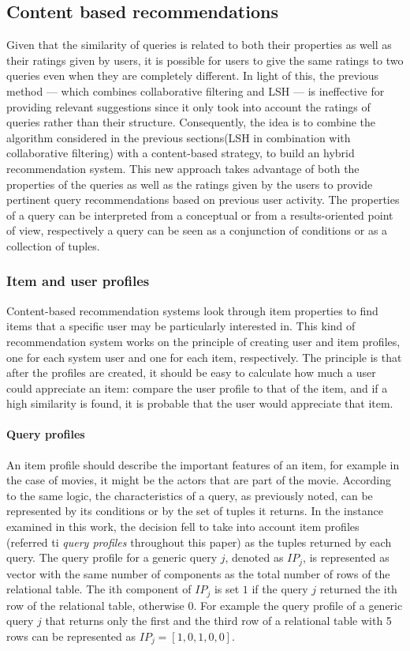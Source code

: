 \subsection{Content based recommendations}  \label{hybrid_rec_sys_solution}
Given that the similarity of queries is related to both their properties as well as their ratings given by users, it is possible for users to give the same ratings to two queries even when they are completely different. In light of this, the previous method — which combines collaborative filtering and LSH — is ineffective for providing relevant suggestions since it only took into account the ratings of queries rather than their structure.
Consequently, the idea is to combine the algorithm considered in the previous sections(LSH in combination with collaborative filtering) with a content-based strategy, to build an hybrid recommendation system. This new approach takes advantage of both the properties of the queries as well as the ratings given by the users to provide pertinent query recommendations based on previous user activity. The properties of a query can be interpreted from a conceptual or from a results-oriented point of view, respectively a query can be seen as a conjunction of conditions or as a collection of tuples. 

\subsubsection{Item and user profiles} Content-based recommendation systems look through item properties to find items that a specific user may be particularly interested in. This kind of recommendation system works on the principle of creating user and item profiles, one for each system user and one for each item, respectively. The principle is that after the profiles are created, it should be easy to calculate how much a user could appreciate an item: compare the user profile to that of the item, and if a high similarity is found, it is probable that the user would appreciate that item. 

\paragraph{Query profiles} An item profile should describe the important features of an item, for example in the case of movies, it might be the actors that are part of the movie. According to the same logic, the characteristics of a query, as previously noted, can be represented by its conditions or by the set of tuples it returns. In the instance examined in this work, the decision fell to take into account item profiles (referred ti \emph{query profiles} throughout this paper) as the tuples returned by each query. The query profile for a generic query $j$, denoted as $IP_j$, is represented as vector with the same number of components as the total number of rows of the relational table. The ith component of $IP_j$ is set $1$ if the query $j$ returned the ith row of the relational table, otherwise $0$. For example the query profile of a generic query $j$ that returns only the first and the third row of a relational table with 5 rows can be represented as $IP_j = [1,0,1,0,0]$. 

